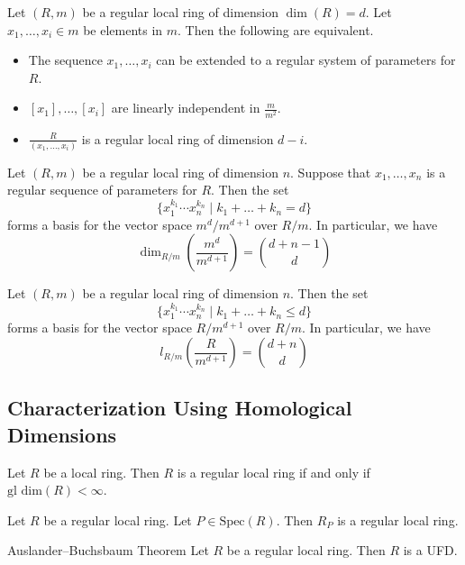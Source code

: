 \documentclass[a4paper]{article}
\begin{document}
\begin{prp}{}{} Let $(R,m)$ be a regular local ring of dimension $\dim(R)=d$. Let $x_1,\dots,x_i\in m$ be elements in $m$. Then the following are equivalent. 
\begin{itemize}
\item The sequence $x_1,\dots,x_i$ can be extended to a regular system of parameters for $R$. 
\item $[x_1],\dots,[x_i]$ are linearly independent in $\frac{m}{m^2}$. 
\item $\frac{R}{(x_1,\dots,x_i)}$ is a regular local ring of dimension $d-i$. 
\end{itemize}
\end{prp}

\begin{prp}{}{} Let $(R,m)$ be a regular local ring of dimension $n$. Suppose that $x_1,\dots,x_n$ is a regular sequence of parameters for $R$. Then the set $$\{x_1^{k_1}\cdots x_n^{k_n}\;|\;k_1+\dots+k_n=d\}$$ forms a basis for the vector space $m^d/m^{d+1}$ over $R/m$. In particular, we have $$\dim_{R/m}\left(\frac{m^d}{m^{d+1}}\right)=\binom{d+n-1}{d}$$
\end{prp}

\begin{crl}{}{} Let $(R,m)$ be a regular local ring of dimension $n$. Then the set $$\{x_1^{k_1}\cdots x_n^{k_n}\;|\;k_1+\dots+k_n\leq d\}$$ forms a basis for the vector space $R/m^{d+1}$ over $R/m$. In particular, we have $$l_{R/m}\left(\frac{R}{m^{d+1}}\right)=\binom{d+n}{d}$$
\end{crl}

\subsection{Characterization Using Homological Dimensions}
\begin{prp}{}{} Let $R$ be a local ring. Then $R$ is a regular local ring if and only if $\text{gl dim}(R)<\infty$. 
\end{prp}

\begin{crl}{}{} Let $R$ be a regular local ring. Let $P\in\text{Spec}(R)$. Then $R_P$ is a regular local ring. 
\end{crl}

\begin{thm}{Auslander–Buchsbaum Theorem}{} Let $R$ be a regular local ring. Then $R$ is a UFD. 
\end{thm}
\end{document}
